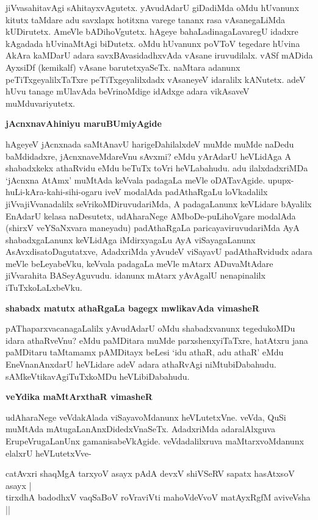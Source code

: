 \noindent
jiVvasahitavAgi sAhitayxvAgutetx. yAvudAdarU giDadiMda oMdu hUvanunx kitutx taMdare adu savxlapx hotitxna varege tananx rasa vAsanegaLiMda kUDirutetx. AmeVle bADihoVgutetx. hAgeye bahaLa\-dina\-gaLa\-varegU idadxre kAgadada hUvinaMtAgi biDutetx. oMdu hUvanunx poVToV tegedare hUvina AkAra kaMDarU adara savxBAvasidadhxvAda vAsane iruvudilalx. vASf mADida AyxsiDf (kemikalf) vAsane barutetx\-yaSeTx. naMtara adanunx peTiTxgeyalilxTaTxre peTiTxgeyalilxdadx vAsaneyeV idaralilx kANutetx. adeV hUvu tanage mUlavAda beVrinoMdige idAdxge adara vikAsaveV muMduvariyutetx.

\newpage

{\bigskip
\noindent
{\large\bf jAcnxnavAhiniyu maruBUmiyAgide}}\label{page110}
\medskip

\noindent
hAgeyeV jAcnxnada saMtAnavU harigeDahilalxdeV muMde muMde naDedu 
baMdidadxre, jAcnxnaveMdareVnu sAvxmi? eMdu yArAdarU heVLidAga A 
shabadxkekx athaRvidu eMdu beTuTx toVri heVLabahudu. adu ilalxdadxriMDa 
`jAcnxna AtAmx' muMtAda keVvala padagaLa meVle oDATavAgide. 
upupx-huLi-kAra-kahi-\-sihi-ogaru iveV modalAda padAthaRgaLu loVkadalilx 
jiVvajiVvanadalilx seVrikoMDiruvudariMda, A padagaLanunx keVLidare bAyalilx EnAdarU kelasa naDesutetx, udAharaNege AMboDe-puLihoVgare moda\-lAda (shirxV veYSaNxvara maneyadu) padAthaRgaLa paricayaviruvudariMda AyA shabadxgaLanunx keVLidAga iMdirxyagaLu AyA viSayagaLanunx AsAvxdisatoDagutatxve, AdadxriMda yAvudeV viSayavU padAthaR\-vidudx adara meVle beLeyabeVku, keVvala padagaLa meVle mAtarx ADuvaMtAdare jiVvarahita BASeyAgu\-vudu. idanunx mAtarx yAvAgalU nenapinalilx iTuTxkoLaLxbeVku.

{\bigskip
\noindent
{\large\bf shabadx matutx athaRgaLa bagegx mwlikavAda vimasheR}}\label{page111}
\medskip

\noindent
pAThaparxvacanagaLalilx yAvudAdarU oMdu shabadxvanunx tegedukoMDu idara 
athaRveVnu? eMdu paMDitara muMde parxshenxyiTaTxre, hatAtxru jana paMDitaru taMtamamx pAMDitayx beLesi `idu athaR, adu athaR' eMdu EneVnanAnxdarU heVLidare adeV adara athaRvAgi niMtubiDabahudu. sAMkeVtikavAgiTuTx\-koMDu heVLibiDabahudu.

{\bigskip
\noindent
{\large\bf veYdika maMtArxthaR vimasheR}}\label{page111}
\medskip

\noindent
udAharaNege veVdakAlada viSayavoMdanunx heVLutetxVne. veVda, QuSi 
muMtAda mAtugaLanAnxDi\-dedxV\-naSeTx. AdadxriMda adaralAlxguva 
ErupeVrugaLanUnx gamanisabeVkAgide. veVdadalilxruva maMtarxvoMdanunx elalxrU heVLutetxVve-

\begin{shloka}
catAvxri shaqMgA tarxyoV asayx pAdA devxV shiVSeRV sapatx hasAtxsoV asayx |\\\label{111}
tirxdhA badodhxV vaqSaBoV roVraviVti mahoVdeVvoV matAyxRgfM aviveVsha ||
\end{shloka}

